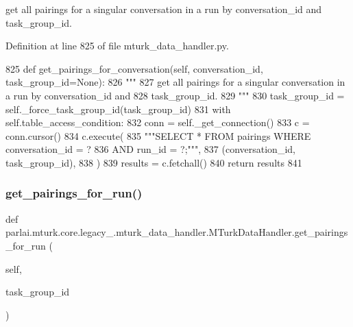 \begin{DoxyVerb}get all pairings for a singular conversation in a run by conversation_id and
task_group_id.
\end{DoxyVerb}
 

Definition at line 825 of file mturk\+\_\+data\+\_\+handler.\+py.


\begin{DoxyCode}
825     \textcolor{keyword}{def }get\_pairings\_for\_conversation(self, conversation\_id, task\_group\_id=None):
826         \textcolor{stringliteral}{"""}
827 \textcolor{stringliteral}{        get all pairings for a singular conversation in a run by conversation\_id and}
828 \textcolor{stringliteral}{        task\_group\_id.}
829 \textcolor{stringliteral}{        """}
830         task\_group\_id = self.\_force\_task\_group\_id(task\_group\_id)
831         with self.table\_access\_condition:
832             conn = self.\_get\_connection()
833             c = conn.cursor()
834             c.execute(
835                 \textcolor{stringliteral}{"""SELECT * FROM pairings WHERE conversation\_id = ?}
836 \textcolor{stringliteral}{                         AND run\_id = ?;"""},
837                 (conversation\_id, task\_group\_id),
838             )
839             results = c.fetchall()
840             \textcolor{keywordflow}{return} results
841 
\end{DoxyCode}
\mbox{\label{classparlai_1_1mturk_1_1core_1_1legacy__2018_1_1mturk__data__handler_1_1MTurkDataHandler_acdb06b52aa67442098fc2856deee1ce7}} 
\subsubsection{\texorpdfstring{get\+\_\+pairings\+\_\+for\+\_\+run()}{get\_pairings\_for\_run()}}
{\footnotesize\ttfamily def parlai.\+mturk.\+core.\+legacy\+\_.\+mturk\+\_\+data\+\_\+handler.\+M\+Turk\+Data\+Handler.\+get\+\_\+pairings\+\_\+for\+\_\+run (\begin{DoxyParamCaption}\item[{}]{self,  }\item[{}]{task\+\_\+group\+\_\+id }\end{DoxyParamCaption})}

